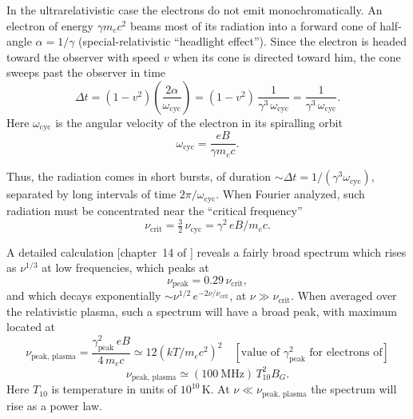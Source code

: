 In the ultrarelativistic case the electrons do not emit monochromatically.
An electron of energy $\gamma m_e c^2$ beams most of its radiation into a forward cone of
half-angle $\alpha = 1/\gamma$ (special-relativistic ``headlight effect'').
Since the electron is
headed toward the observer with speed $v$ when its cone is directed toward him,
the cone sweeps past the observer in time
\begin{equation}
\Delta t = (1-v^2)\left(\frac{2\alpha}{\omega_{\text{cyc}}}\right) = (1-v^2)\,\frac{1}{\gamma^3\,\omega_{\text{cyc}}}
= \frac{1}{\gamma^3\,\omega_{\text{cyc}}}.
\tag{2.3.14}
\end{equation}
Here $\omega_{\text{cyc}}$ is the angular velocity of the electron in its spiralling orbit
\begin{equation}
\omega_{\text{cyc}} = \frac{eB}{\gamma m_e c}.
\tag{2.3.15}
\end{equation}

Thus, the radiation comes in short bursts, of duration $\sim\!\Delta t = 1/(\gamma^3\omega_{\text{cyc}})$,
separated by long intervals of time $2\pi/\omega_{\text{cyc}}$.
When Fourier analyzed, such
radiation must be concentrated near the ``critical frequency''
\begin{equation}
\nu_{\text{crit}} = \tfrac{3}{2}\,\nu_{\text{cyc}} = \gamma^2\,eB/m_e c.
\tag{2.3.16}
\end{equation}

A detailed calculation [chapter~14 of \citet{Jackson1962}] reveals a fairly broad
spectrum which rises as $\nu^{1/3}$ at low frequencies, which peaks at
\begin{equation}
\nu_{\text{peak}} = 0.29\,\nu_{\text{crit}},
\tag{2.3.17}
\end{equation}
and which decays exponentially $\sim\nu^{1/2}\,e^{-2\nu/\nu_{\text{crit}}}$, at $\nu \gg \nu_{\text{crit}}$.
When averaged over the relativistic plasma, such a spectrum will have a broad
peak, with maximum located at
\begin{equation}
\nu_{\text{peak, plasma}} = \frac{\gamma_{\text{peak}}^2\,eB}{4\,m_e c}
\simeq 12(kT/m_e c^2)^2
\quad\left[\text{value of $\gamma_{\text{peak}}^2$ for electrons of}\right]
\tag{2.3.18}
\end{equation}
\begin{equation}
\nu_{\text{peak, plasma}} \simeq (100~\text{MHz})\,T_{10}^2 B_G.
\tag*{}
\end{equation}
Here $T_{10}$ is temperature in units of $10^{10}$\,K.
At $\nu \ll \nu_{\text{peak, plasma}}$
the spectrum will rise as a power law.

